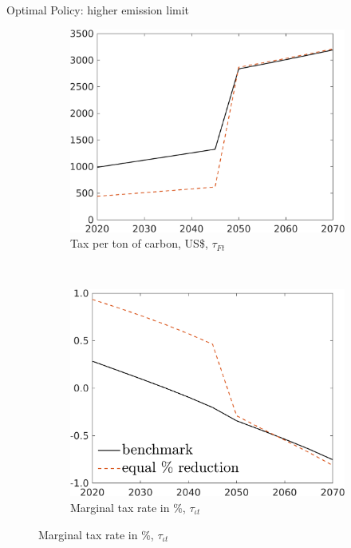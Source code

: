 \documentclass[11pt,aspectratio=169]{beamer}
\begin{document}
\begin{frame}{Optimal Policy: higher emission limit}
\hypertarget{altems}{}
\vspace{-3mm}
\begin{figure}[h!!]
	
	
	\begin{subfigure}{0.4\textwidth}		
		\caption{Tax per ton of carbon,  US\$, $\tau_{Ft}$}
		\includegraphics[width=1\textwidth]{../codding_model/own_basedOnFried/optimalPol_010922_revision/figures/all_13Sept22/Ems_Sens_Tauf_spillover0_knspil0_xgr0_nsk0_sep0_extern0_PV1_etaa0.79_lgd0.png}
	\end{subfigure}	
	\begin{minipage}[]{0.1\textwidth}
		\ 
	\end{minipage}
	\begin{subfigure}{0.4\textwidth}		
		\caption{Marginal tax rate in \%, $\tau_{\iota t}$}
		\includegraphics[width=1\textwidth]{../codding_model/own_basedOnFried/optimalPol_010922_revision/figures/all_13Sept22/Ems_Sens_dTaulAv_spillover0_knspil0_xgr0_nsk0_sep0_extern0_PV1_etaa0.79_lgd1.png}
	\end{subfigure}
	

\end{figure}
\end{frame}
\end{document}
